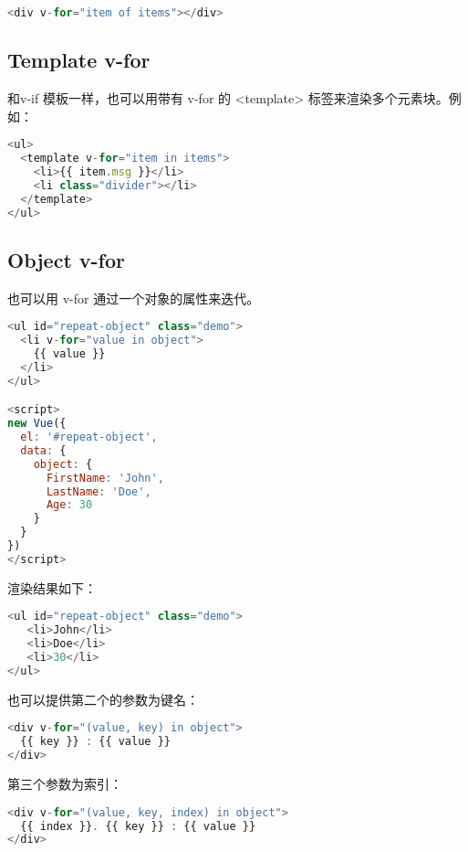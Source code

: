 \begin{lstlisting}[language=JavaScript]
<div v-for="item of items"></div>
\end{lstlisting}


\subsection{Template v-for}


和v-if 模板一样，也可以用带有 v-for 的 <template> 标签来渲染多个元素块。例如：

\begin{lstlisting}[language=JavaScript]
<ul>
  <template v-for="item in items">
    <li>{{ item.msg }}</li>
    <li class="divider"></li>
  </template>
</ul>
\end{lstlisting}

\subsection{Object v-for}

也可以用 v-for 通过一个对象的属性来迭代。


\begin{lstlisting}[language=JavaScript]
<ul id="repeat-object" class="demo">
  <li v-for="value in object">
    {{ value }}
  </li>
</ul>

<script>
new Vue({
  el: '#repeat-object',
  data: {
    object: {
      FirstName: 'John',
      LastName: 'Doe',
      Age: 30
    }
  }
})
</script>
\end{lstlisting}

渲染结果如下：

\begin{lstlisting}[language=JavaScript]
<ul id="repeat-object" class="demo">
   <li>John</li>
   <li>Doe</li>
   <li>30</li>
</ul>
\end{lstlisting}

也可以提供第二个的参数为键名：


\begin{lstlisting}[language=JavaScript]
<div v-for="(value, key) in object">
  {{ key }} : {{ value }}
</div>
\end{lstlisting}

第三个参数为索引：

\begin{lstlisting}[language=JavaScript]
<div v-for="(value, key, index) in object">
  {{ index }}. {{ key }} : {{ value }}
</div>
\end{lstlisting}


